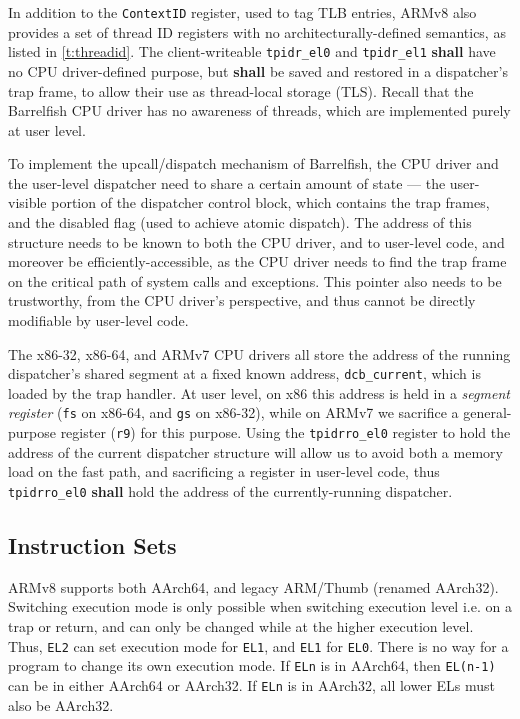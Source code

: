 \documentclass[a4paper,twoside]{report}
\begin{document}
In addition to the \texttt{ContextID} register, used to tag TLB entries, ARMv8
also provides a set of thread ID registers with no architecturally-defined
semantics, as listed in \autoref{t:threadid}. The client-writeable
\texttt{tpidr\_el0} and \texttt{tpidr\_el1} \textbf{shall} have no CPU
driver-defined purpose, but \textbf{shall} be saved and restored in a
dispatcher's trap frame, to allow their use as thread-local storage (TLS).
Recall that the Barrelfish CPU driver has no awareness of threads, which are
implemented purely at user level.

To implement the upcall/dispatch mechanism of Barrelfish, the CPU driver and
the user-level dispatcher need to share a certain amount of state --- the
user-visible portion of the dispatcher control block, which contains the trap
frames, and the disabled flag (used to achieve atomic dispatch). The address
of this structure needs to be known to both the CPU driver, and to user-level
code, and moreover be efficiently-accessible, as the CPU driver needs to find
the trap frame on the critical path of system calls and exceptions. This
pointer also needs to be trustworthy, from the CPU driver's perspective, and
thus cannot be directly modifiable by user-level code.

The x86-32, x86-64, and ARMv7 CPU drivers all store the address of the running
dispatcher's shared segment at a fixed known address, \texttt{dcb\_current},
which is loaded by the trap handler. At user level, on x86 this address is
held in a \emph{segment register} (\texttt{fs} on x86-64, and \texttt{gs} on
x86-32), while on ARMv7 we sacrifice a general-purpose register (\texttt{r9})
for this purpose. Using the \texttt{tpidrro\_el0} register to hold the address
of the current dispatcher structure will allow us to avoid both a memory load
on the fast path, and sacrificing a register in user-level code, thus
\texttt{tpidrro\_el0} \textbf{shall} hold the address of the currently-running
dispatcher.

\subsection{Instruction Sets}

ARMv8 supports both AArch64, and legacy ARM/Thumb (renamed AArch32). Switching
execution mode is only possible when switching execution level i.e. on a trap
or return, and can only be changed while at the higher execution level. Thus,
\texttt{EL2} can set execution mode for \texttt{EL1}, and \texttt{EL1} for
\texttt{EL0}. There is no way for a program to change its own execution mode.
If \texttt{ELn} is in AArch64, then \texttt{EL(n-1)} can be in either AArch64
or AArch32. If \texttt{ELn} is in AArch32, all lower ELs must also be AArch32.
\end{document}
